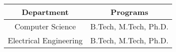 
\begin{tabular}{|c|c|}
    \hline
    Department & Programs \\
    \hline
    Computer Science & B.Tech, M.Tech, Ph.D. \\
    Electrical Engineering & B.Tech, M.Tech, Ph.D. \\
    \hline
\end{tabular}
